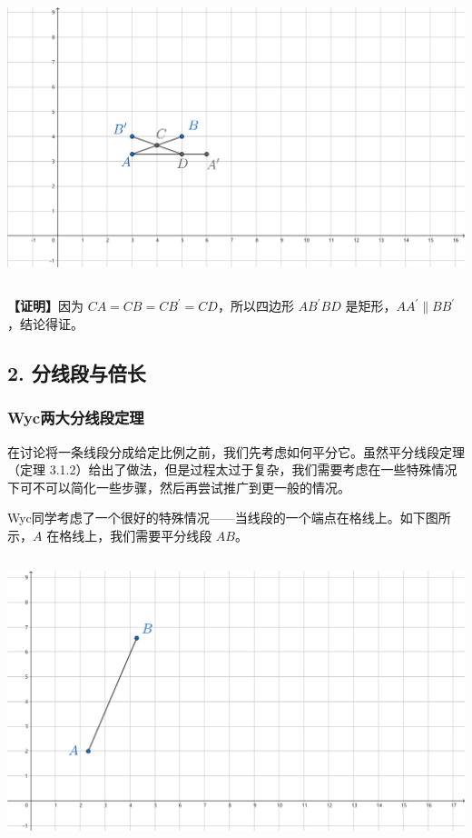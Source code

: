 \documentclass[UTF8]{article}
\begin{document}
\includegraphics[width=5.76806in,height=3.27847in]{media/image16.png}

\textbf{【证明】}因为 \(CA = CB = CB^{'} = CD\)，所以四边形 \(AB^{'}BD\)
是矩形，\(AA^{'} \parallel BB^{'}\)，结论得证。

\hypertarget{ux5206ux7ebfux6bb5ux4e0eux500dux957f}{%
\subsection{2.
分线段与倍长}\label{ux5206ux7ebfux6bb5ux4e0eux500dux957f}}

\hypertarget{wycux4e24ux5927ux5206ux7ebfux6bb5ux5b9aux7406}{%
\subsubsection{Wyc两大分线段定理}\label{wycux4e24ux5927ux5206ux7ebfux6bb5ux5b9aux7406}}

在讨论将一条线段分成给定比例之前，我们先考虑如何平分它。虽然平分线段定理（定理
3.1.2）给出了做法，但是过程太过于复杂，我们需要考虑在一些特殊情况下可不可以简化一些步骤，然后再尝试推广到更一般的情况。

Wyc同学考虑了一个很好的特殊情况------当线段的一个端点在格线上。如下图所示，\(A\)
在格线上，我们需要平分线段 \(AB\)。

\includegraphics[width=5.76806in,height=3.27847in]{media/image17.png}
\end{document}
